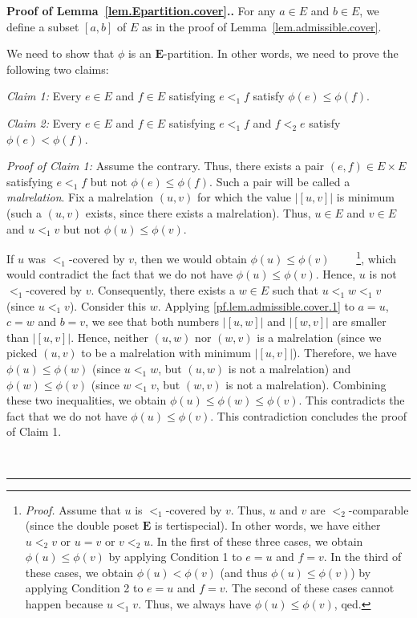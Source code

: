 \documentclass[numbers=enddot,12pt,final,onecolumn,notitlepage,abstracton]{scrartcl}%
\theoremstyle{definition}
\newenvironment{proof}[1][Proof]{\noindent\textbf{#1.} }{\ \rule{0.5em}{0.5em}}
\newcommand{\EE}{{\mathbf{E}}}
\begin{document}
\begin{proof}[Proof of Lemma~\ref{lem.Epartition.cover}.]
For any $a \in E$ and $b \in E$, we define a subset
$\left[a, b\right]$ of $E$ as in the proof of
Lemma~\ref{lem.admissible.cover}.

We need to show that $\phi$ is an $\EE$-partition. In other words,
we need to prove the following two claims:

\textit{Claim 1:} Every $e \in E$ and $f \in E$ satisfying
$e <_1 f$ satisfy $\phi\left(e\right) \leq \phi\left(f\right)$.

\textit{Claim 2:} Every $e \in E$ and $f \in E$ satisfying
$e <_1 f$ and $f <_2 e$ satisfy
$\phi\left(e\right) < \phi\left(f\right)$.

\textit{Proof of Claim 1:} Assume the contrary. Thus, there
exists a pair $\left(e, f\right) \in E \times E$ satisfying
$e <_1 f$ but not $\phi\left(e\right) \leq \phi\left(f\right)$.
Such a pair will be called a \textit{malrelation}. Fix a
malrelation $\left(u, v\right)$ for which the value
$\left|\left[u, v\right]\right|$ is minimum (such a
$\left(u, v\right)$ exists, since there exists a malrelation).
Thus, $u \in E$ and $v \in E$ and $u <_1 v$ but not
$\phi\left(u\right) \leq \phi\left(v\right)$.

If $u$ was $<_1$-covered by $v$, then we would obtain
$\phi\left(u\right) \leq \phi\left(v\right)$
\ \ \ \ \footnote{\textit{Proof.} Assume that $u$ is
$<_1$-covered by $v$. Thus, $u$ and $v$ are $<_2$-comparable
(since the double poset $\EE$ is tertispecial). In other words,
we have either $u <_2 v$ or $u = v$ or $v <_2 u$. In the
first of these three cases, we obtain
$\phi\left(u\right) \leq \phi\left(v\right)$ by applying
Condition 1 to $e = u$ and $f = v$. In the third of these
cases, we obtain
$\phi\left(u\right) < \phi\left(v\right)$ (and thus
$\phi\left(u\right) \leq \phi\left(v\right)$) 
by applying Condition 2 to $e = u$ and $f = v$. The second
of these cases cannot happen because $u <_1 v$. Thus, we
always have $\phi\left(u\right) \leq \phi\left(v\right)$,
qed.}, which would
contradict the fact that we do not have
$\phi\left(u\right) \leq \phi\left(v\right)$. Hence, $u$ is not
$<_1$-covered by $v$. Consequently, there exists a $w \in E$
such that $u <_1 w <_1 v$ (since $u <_1 v$). Consider this
$w$. Applying \eqref{pf.lem.admissible.cover.1} to $a = u$,
$c = w$ and $b = v$, we see that both numbers
$\left|\left[u, w\right]\right|$ and
$\left|\left[w, v\right]\right|$ are smaller than
$\left|\left[u, v\right]\right|$. Hence, neither
$\left(u, w\right)$ nor $\left(w, v\right)$ is a malrelation
(since we picked $\left(u, v\right)$ to be a malrelation with
minimum $\left|\left[u, v\right]\right|$). Therefore, we have
$\phi\left(u\right) \leq \phi\left(w\right)$ (since $u <_1 w$,
but $\left(u, w\right)$ is not a malrelation) and
$\phi\left(w\right) \leq \phi\left(v\right)$ (since $w <_1 v$,
but $\left(w, v\right)$ is not a malrelation).
Combining these two inequalities, we obtain
$\phi\left(u\right) \leq \phi\left(w\right)
\leq \phi\left(v\right)$. This contradicts
the fact that we do not have
$\phi\left(u\right) \leq \phi\left(v\right)$. This contradiction
concludes the proof of Claim 1.


\end{proof}
\end{document}
